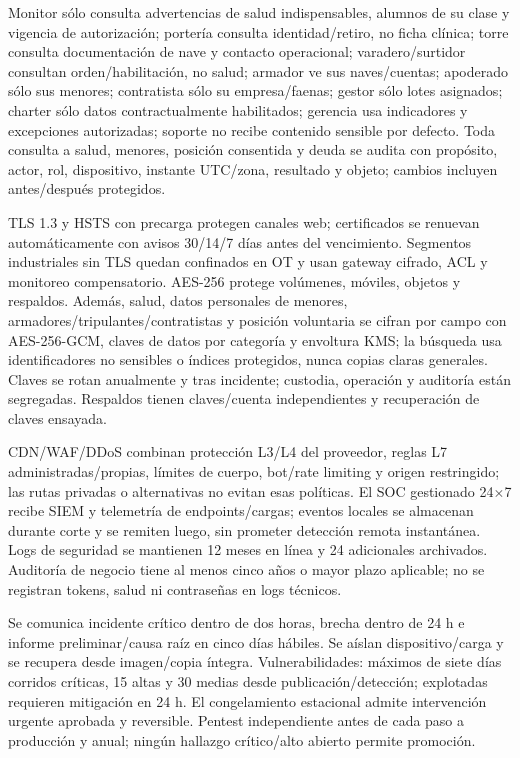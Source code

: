 \documentclass[11pt,letterpaper]{report}
\begin{document}
Monitor sólo consulta advertencias de salud indispensables, alumnos de su clase y vigencia de autorización; portería consulta identidad/retiro, no ficha clínica; torre consulta documentación de nave y contacto operacional; varadero/surtidor consultan orden/habilitación, no salud; armador ve sus naves/cuentas; apoderado sólo sus menores; contratista sólo su empresa/faenas; gestor sólo lotes asignados; charter sólo datos contractualmente habilitados; gerencia usa indicadores y excepciones autorizadas; soporte no recibe contenido sensible por defecto. Toda consulta a salud, menores, posición consentida y deuda se audita con propósito, actor, rol, dispositivo, instante UTC/zona, resultado y objeto; cambios incluyen antes/después protegidos.

TLS 1.3 y HSTS con precarga protegen canales web; certificados se renuevan automáticamente con avisos 30/14/7 días antes del vencimiento. Segmentos industriales sin TLS quedan confinados en OT y usan gateway cifrado, ACL y monitoreo compensatorio. AES-256 protege volúmenes, móviles, objetos y respaldos. Además, salud, datos personales de menores, armadores/tripulantes/contratistas y posición voluntaria se cifran por campo con AES-256-GCM, claves de datos por categoría y envoltura KMS; la búsqueda usa identificadores no sensibles o índices protegidos, nunca copias claras generales. Claves se rotan anualmente y tras incidente; custodia, operación y auditoría están segregadas. Respaldos tienen claves/cuenta independientes y recuperación de claves ensayada.

CDN/WAF/DDoS combinan protección L3/L4 del proveedor, reglas L7 administradas/propias, límites de cuerpo, bot/rate limiting y origen restringido; las rutas privadas o alternativas no evitan esas políticas. El SOC gestionado 24$\times$7 recibe SIEM y telemetría de endpoints/cargas; eventos locales se almacenan durante corte y se remiten luego, sin prometer detección remota instantánea. Logs de seguridad se mantienen 12 meses en línea y 24 adicionales archivados. Auditoría de negocio tiene al menos cinco años o mayor plazo aplicable; no se registran tokens, salud ni contraseñas en logs técnicos.

Se comunica incidente crítico dentro de dos horas, brecha dentro de 24 h e informe preliminar/causa raíz en cinco días hábiles. Se aíslan dispositivo/carga y se recupera desde imagen/copia íntegra. Vulnerabilidades: máximos de siete días corridos críticas, 15 altas y 30 medias desde publicación/detección; explotadas requieren mitigación en 24 h. El congelamiento estacional admite intervención urgente aprobada y reversible. Pentest independiente antes de cada paso a producción y anual; ningún hallazgo crítico/alto abierto permite promoción.
\end{document}
